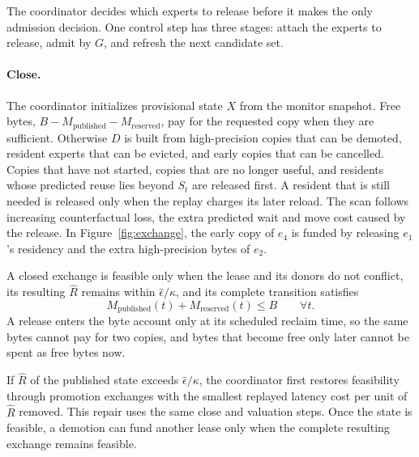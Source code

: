 The coordinator decides which experts to release before it makes the only admission decision.
One control step has three stages: attach the experts to release, admit by \(G\), and refresh the next candidate set.

\paragraph{Close.}
The coordinator initializes provisional state \(X\) from the monitor snapshot.
Free bytes, \(B-M_{\mathrm{published}}-M_{\mathrm{reserved}}\), pay for the requested copy when they are sufficient.
Otherwise \(D\) is built from high-precision copies that can be demoted, resident experts that can be evicted, and early copies that can be cancelled.
Copies that have not started, copies that are no longer useful, and residents whose predicted reuse lies beyond \(S_t\) are released first.
A resident that is still needed is released only when the replay charges its later reload.
The scan follows increasing counterfactual loss, the extra predicted wait and move cost caused by the release.
In Figure~\ref{fig:exchange}, the early copy of \(e_4\) is funded by releasing \(e_1\)'s residency and the extra high-precision bytes of \(e_2\).

A closed exchange is feasible only when the lease and its donors do not conflict, its resulting \(\widehat R\) remains within \(\widehat\epsilon/\kappa\), and its complete transition satisfies
\begin{equation}
  M_{\mathrm{published}}(t)+M_{\mathrm{reserved}}(t)\le B
  \qquad \forall t.
  \label{eq:fit}
\end{equation}
A release enters the byte account only at its scheduled reclaim time, so the same bytes cannot pay for two copies, and bytes that become free only later cannot be spent as free bytes now.

If \(\widehat R\) of the published state exceeds \(\widehat\epsilon/\kappa\), the coordinator first restores feasibility through promotion exchanges with the smallest replayed latency cost per unit of \(\widehat R\) removed.
This repair uses the same close and valuation steps.
Once the state is feasible, a demotion can fund another lease only when the complete resulting exchange remains feasible.

